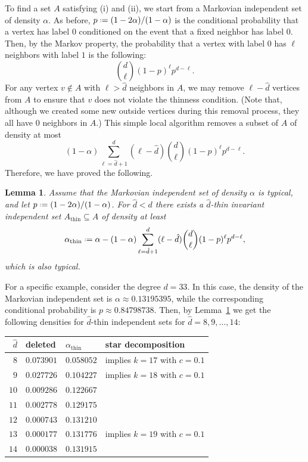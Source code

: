\documentclass[12pt]{amsart}
\newtheorem{lemma}[theorem]{Lemma}
\theoremstyle{definition}
\newcommand\dhat{\hat{d}}
\newcommand\al{\alpha}
\newcommand\althin{\al_{\mathrm{thin}}}
\newcommand{\defeq}{\mathrel{\vcenter{\baselineskip0.5ex \lineskiplimit0pt
                     \hbox{\scriptsize.}\hbox{\scriptsize.}}}%
                     =}
\begin{document}
To find a set $A$ satisfying (i) and (ii), we start from a Markovian independent set of density $\al$. As before, $p \defeq (1-2\al)/(1-\al)$ is the conditional probability that a vertex has label $0$ conditioned on the event that a fixed neighbor has label $0$. Then, by the Markov property, the probability that a vertex with label $0$ has $\ell$ neighbors with label $1$ is the following: 
%
\[ \binom{d}{\ell} (1-p)^\ell p^{d-\ell} .\]
%
For any vertex $v \notin A$ with $\ell > \dhat$ neighbors in $A$, we may remove $\ell-\dhat$ vertices from $A$ to ensure that $v$ does not violate the thinness condition. (Note that, although we created some new outside vertices during this removal process, they all have $0$ neighbors in $A$.) This simple local algorithm removes a subset of $A$ of density at most 
%
\[ (1-\al) \sum_{\ell=\dhat+1}^d (\ell-\dhat) 
\binom{d}{\ell} (1-p)^\ell p^{d-\ell} .\]
%
Therefore, we have proved the following.
%
\begin{lemma} \label{lem:thinning}
Assume that the Markovian independent set of density $\al$ is typical, and let $p \defeq (1-2\al)/(1-\al)$. For $\dhat < d$ there exists a $\dhat$-thin invariant independent set $A_{\mathrm{thin}} \subseteq A$ of density at least
%
\[ \althin \defeq 
\al - (1-\al) \sum_{\ell=\dhat+1}^d (\ell-\dhat) 
\binom{d}{\ell} (1-p)^\ell p^{d-\ell} ,\]
%
which is also typical.
\end{lemma}
%

For a specific example, consider the degree $d=33$. In this case, the density of the Markovian independent set is $\al \approx 0.13195395$, while the corresponding conditional probability is $p \approx 0.84798738$. Then, by Lemma~\ref{lem:thinning} we get the following densities for $\dhat$-thin independent sets for $\dhat=8,9,\ldots,14$:

\medskip

\begin{center}
\begin{tabular}{r||l|l|l}
$\dhat$ & deleted & $\althin$ & star decomposition \\
\hline
$8$  & $0.073901$ & $0.058052$ & implies $k=17$ with $c=0.1$  \\
$9$  & $0.027726$ & $0.104227$ & implies $k=18$ with $c=0.1$   \\
$10$ & $0.009286$ & $0.122667$ &    \\
$11$ & $0.002778$ & $0.129175$ &    \\
$12$ & $0.000743$ & $0.131210$ &    \\
$13$ & $0.000177$ & $0.131776$ & implies $k=19$ with $c=0.1$ \\
$14$ & $0.000038$ & $0.131915$ &  
\end{tabular}
\end{center}
\end{document}
